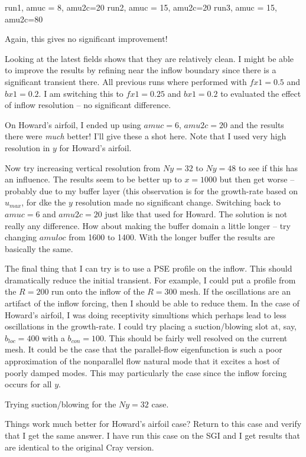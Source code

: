 \documentclass[12pt]{article}
\begin{document}
run1, amuc = 8,  amu2c=20
run2, amuc = 15, amu2c=20
run3, amuc = 15, amu2c=80

Again, this gives no significant improvement!

Looking at the latest fields shows that they are relatively clean.  I might be
able to improve the results by refining near the inflow boundary since there
is a significant transient there.  All previous runs where performed with $fx1
= 0.5$ and $bx1=0.2$.  I am switching this to $fx1=0.25$ and $bx1=0.2$ to
evaluated the effect of inflow resolution -- no significant difference.  

On Howard's airfoil, I ended up using $amuc=6$, $amu2c=20$ and the results
there were {\em much} better!  I'll give these a shot here.  Note that I used
very high resolution in $y$ for Howard's airfoil.

Now try increasing vertical resolution from $Ny=32$ to $Ny=48$ to see if this
has an influence.  The results seem to be better up to $x=1000$ but then get
worse -- probably due to my buffer layer (this observation is for the
growth-rate based on $u_{max}$, for dke the $y$ resolution made no significant
change.  Switching back to $amuc=6$ and $amu2c=20$ just like that used for
Howard.  The solution is not really any difference.  How about making the
buffer domain a little longer -- try changing $amuloc$ from 1600 to 1400.
With the longer buffer the results are basically the same.

The final thing that I can try is to use a PSE profile on the inflow.  This
should dramatically reduce the initial transient.  For example, I could put a
profile from the $R=200$ run onto the inflow of the $R=300$ mesh.  If the
oscillations are an artifact of the inflow forcing, then I should be able to
reduce them.  In the case of Howard's airfoil, I was doing receptivity
simultions which perhaps lead to less oscillations in the growth-rate.  I
could try placing a suction/blowing slot at, say, $b_{loc}=400$ with a
$b_{con}=100$.  This should be fairly well resolved on the current mesh.  It
could be the case that the parallel-flow eigenfunction is such a poor
approximation of the nonparallel flow natural mode that it excites a host of
poorly damped modes.  This may particularly the case since the inflow forcing
occurs for all $y$.  

Trying suction/blowing for the $Ny=32$ case.

Things work much better for Howard's airfoil case?  Return to this case and
verify that I get the same answer.  I have run this case on the SGI and I
get results that are identical to the original Cray version.
\end{document}

